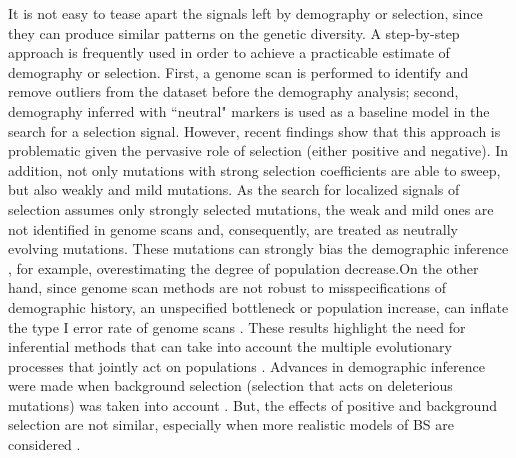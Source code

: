 \documentclass[a4paper, 12pt]{article}
\begin{document}
It is not easy to tease apart the signals left by demography or selection, since they can produce similar patterns on the genetic diversity. A step-by-step approach is frequently used in order to achieve a practicable estimate of demography or selection. First, a genome scan is performed to identify and remove outliers from the dataset before the demography analysis; second, demography inferred with “neutral" markers is used as a baseline model in the search for a selection signal. However, recent findings show that this approach is problematic given the pervasive role of selection (either positive and negative)\citep{Sella:2009hs,Hernandez:2011dn,Charlesworth:2012ix,Harris:2018bm,Lange:2018fl}. In addition, not only mutations with strong selection coefficients are able to sweep, but also weakly and mild mutations. As the search for localized signals of selection assumes only  strongly selected mutations, the weak and mild ones are not identified in genome scans and, consequently, are treated as neutrally evolving mutations. These mutations can strongly bias the demographic inference \citep{Huber:2015cl, Pavlidis:2010bb, Ewing:2016gv}, for example, overestimating the degree of population decrease.On the other hand, since genome scan methods are not robust to misspecifications of demographic history, an unspecified bottleneck or population increase, can inflate the type I error rate of genome scans \citep{Jensen:2005ky, Jensen:2007jw, Schrider:2016gg}. These results highlight the need for inferential methods that can take into account the multiple evolutionary processes that jointly act on populations \citep{Lin:2011jv, Li:2012bh, Bank:2014hx}. Advances in demographic inference were made when background selection (selection that acts on deleterious mutations) was taken into account \citep{Johri:2019jv}. But, the effects of positive and background selection are not similar, especially when more realistic models of BS are considered \citep{Schrider:2019ih}.
\end{document}
